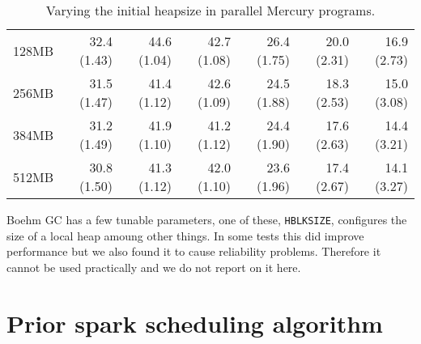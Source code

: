 \begin{table}
\begin{center}
\begin{tabular}{r|rr|rrrr}
128MB  & 32.4 (1.43) & 44.6 (1.04) & 42.7 (1.08) & 26.4 (1.75) & 20.0 (2.31) & 16.9 (2.73) \\
256MB  & 31.5 (1.47) & 41.4 (1.12) & 42.6 (1.09) & 24.5 (1.88) & 18.3 (2.53) & 15.0 (3.08) \\
384MB  & 31.2 (1.49) & 41.9 (1.10) & 41.2 (1.12) & 24.4 (1.90) & 17.6 (2.63) & 14.4 (3.21) \\
512MB  & 30.8 (1.50) & 41.3 (1.12) & 42.0 (1.10) & 23.6 (1.96) & 17.4 (2.67) & 14.1 (3.27) \\
\end{tabular}
\end{center}
\caption{Varying the initial heapsize in parallel Mercury programs.}
\label{tab:heapsize}
\end{table}



Boehm GC has a few tunable parameters, one of these, \texttt{HBLKSIZE},
configures the size of a local heap amoung other things.
In some tests this did improve performance but we also found it to cause
reliability problems.
Therefore it cannot be used practically and we do not report on it here.


\section{Prior spark scheduling algorithm}
\label{sec:old_scheduling}





